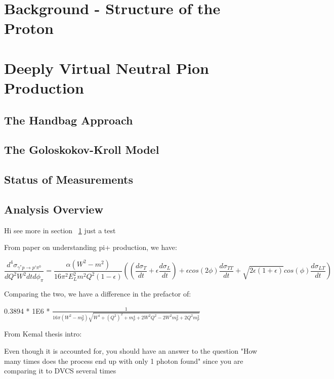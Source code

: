\section{Background - Structure of the Proton}\label{ch1:sec1:background}

\section{Deeply Virtual Neutral Pion Production}
    \subsection{The Handbag Approach}
    \subsection{The Goloskokov-Kroll Model}
    \subsection{Status of Measurements}
    \subsection{Analysis Overview}
    
Hi \cite{Bedlinskiy2014} see more in section ~\ref{ch1:sec1:background}
just a test

\iffalse


From paper on understanding pi+ production, we have:

 \begin{equation}\label{xsec}
     \frac{d^4\sigma_{\gamma^*p \rightarrow p'\pi^0}}{dQ^2W^2dtd\phi_{\pi}} =
     \frac{\alpha (W^2-m^2)}{16\pi^2 E^2_L m^2 Q^2 (1-\epsilon)}
     ((\frac{d\sigma_T}{dt}+\epsilon\frac{d\sigma_L}{dt})+
     \epsilon cos(2\phi) \frac{d\sigma_{TT}}{dt} + \sqrt{2\epsilon(1+\epsilon)}cos(\phi)\frac{d\sigma_{LT}}{dt})
\end{equation}

Comparing the two, we have a difference in the prefactor of:



0.3894 * 1E6 * $\frac{1}{16\pi(W^2-m_p^2)\sqrt{W^4 + (Q^2)^2+m_p^4+2W^2Q^2-2W^2m_p^2+2Q^2m_p^2}}$




From Kemal thesis intro:

Even though it is accounted for, you should have an answer to the question "How many times does the process end up with only 1 photon found" since you are comparing it to DVCS several times

